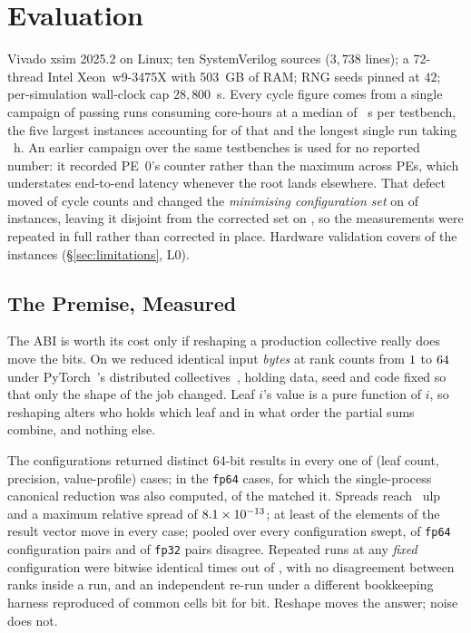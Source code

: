 \documentclass[journal,10pt]{IEEEtran}
\theoremstyle{plain}
\theoremstyle{definition}
\theoremstyle{remark}
\newcommand{\sv}[1]{\texttt{#1}}
\begin{document}
\section{Evaluation}\label{sec:results}

Vivado xsim 2025.2 on Linux; ten SystemVerilog sources ($3{,}738$ lines); a
72-thread Intel Xeon~w9-3475X with 503~GB of RAM; RNG seeds pinned at $42$;
per-simulation wall-clock cap $28{,}800$~s. Every cycle figure comes from a
single campaign of \WallTBs{} passing runs consuming \WallTotalH{} core-hours
at a median of \WallMedianS{}~s per testbench, the five largest instances
accounting for \WallGiantShare{} of that and the longest single run taking
\WallMaxH{}~h. An earlier campaign over the same testbenches is used for no
reported number: it recorded PE~0's counter rather than the maximum across
PEs, which understates end-to-end latency whenever the root lands elsewhere.
That defect moved \ClsFragilePct{} of cycle counts and changed the
\emph{minimising configuration set} on \ClsFragileChanged{} of \TournNInst{}
instances, leaving it disjoint from the corrected set on
\ClsFragileDisjoint{}, so the measurements were repeated in full rather than
corrected in place. Hardware validation covers \TournNInst{} of the
\SuiteSize{} instances (\S\ref{sec:limitations}, L0).

\subsection{The Premise, Measured}\label{sec:results-premise}

The ABI is worth its cost only if reshaping a production collective really
does move the bits. On \GpuHardware{} we reduced identical input \emph{bytes}
at \GpuWorldSizes{} rank counts from $1$ to $64$ under
PyTorch~\GpuStack{}'s distributed collectives~\cite{li2020pytorch}, holding
data, seed and code fixed so that only the shape of the job changed. Leaf $i$'s
value is a pure function of $i$, so reshaping alters who holds which leaf and
in what order the partial sums combine, and nothing else.

The \GpuWorldSizes{} configurations returned \GpuRootsDistinct{} distinct
64-bit results in every one of \GpuCases{} (leaf count, precision,
value-profile) cases; in the \GpuCanonCases{} \sv{fp64} cases, for which the
single-process canonical reduction was also computed, \GpuEqCanonical{} of the
\GpuWorldSizes{} matched it. Spreads reach \GpuUlpMax{}~ulp and a maximum
relative spread of $8.1\times10^{-13}$; at least \GpuElemsMovedMin{} of the
\GpuElemsTotal{} elements of the result vector move in every case; pooled over
every configuration swept, \GpuPairDblPct{} of \sv{fp64} configuration pairs
and \GpuPairSglPct{} of \sv{fp32} pairs disagree. Repeated runs at any
\emph{fixed} configuration were bitwise identical \GpuRepeats{} times out of
\GpuRepeats{}, with no disagreement between ranks inside a run, and an
independent re-run under a different bookkeeping harness reproduced
\GpuXCheck{} of \GpuXCheck{} common cells bit for bit. Reshape moves the
answer; noise does not.
\end{document}
